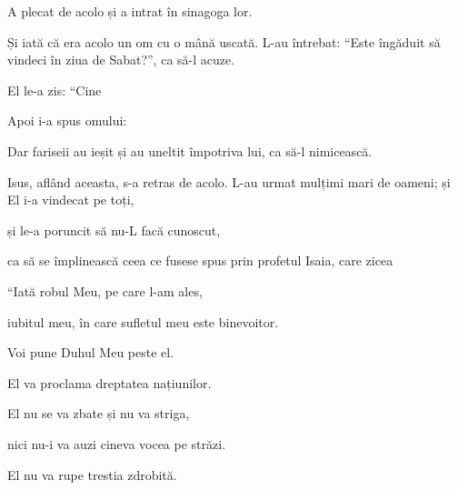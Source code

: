{



\par }{\PP {}A plecat de acolo și a intrat în sinagoga lor.

Și iată că era acolo un om cu o mână uscată. L-au întrebat: “Este îngăduit să vindeci în ziua de Sabat?”, ca să-l acuze.


\par }{\PP {}El le-a zis: “Cine
{}


Apoi i-a spus omului:
{}

Dar fariseii au ieșit și au uneltit împotriva lui, ca să-l nimicească.


\par }{\PP {}Isus, aflând aceasta, s-a retras de acolo. L-au urmat mulțimi mari de oameni; și El i-a vindecat pe toți,

și le-a poruncit să nu-L facă cunoscut,

ca să se împlinească ceea ce fusese spus prin profetul Isaia, care zicea


\par }{\Q {}“Iată robul Meu, pe care l-am ales,

\par }{\QB iubitul meu, în care sufletul meu este binevoitor.

\par }{\Q Voi pune Duhul Meu peste el.

\par }{\QB El va proclama dreptatea națiunilor.


\par }{\Q {}El nu se va zbate și nu va striga,

\par }{\QB nici nu-i va auzi cineva vocea pe străzi.


\par }{\Q {}El nu va rupe trestia zdrobită.

}
